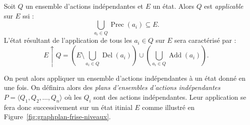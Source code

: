 \begin{proposition}
    Soit $ Q$ un ensemble d'actions indépendantes et $E$ un état. Alors $Q$ est \emph{applicable} sur $E$ ssi : 
    \begin{equation}
        \bigcup_{a_i \in Q} \operatorname{Prec}(a_i) \subseteq E. 
    \end{equation}
    L'état résultant de l'application de tous les $a_i \in Q$ sur $E$ sera caractérisé par : 
    \begin{equation}
        E \uparrow Q = \left(E \setminus \bigcup_{a_i \in Q} \operatorname{Del}(a_i)\right) \cup \left( \bigcup_{a_i \in Q} \operatorname{Add}(a_i)\right). 
    \end{equation}
\end{proposition}

On peut alors appliquer un ensemble d'actions indépendantes à un état donné en une fois. On définira alors des \emph{plans d'ensembles d'actions indépendantes} $ P = \langle Q_1, Q_2, \dots, Q_n \rangle$ où les $Q_i$ sont des actions indépendantes. Leur application se fera donc successivement sur un état itinial $E$ comme illustré en Figure~\ref{fig:graphplan-frise-niveaux}. 

